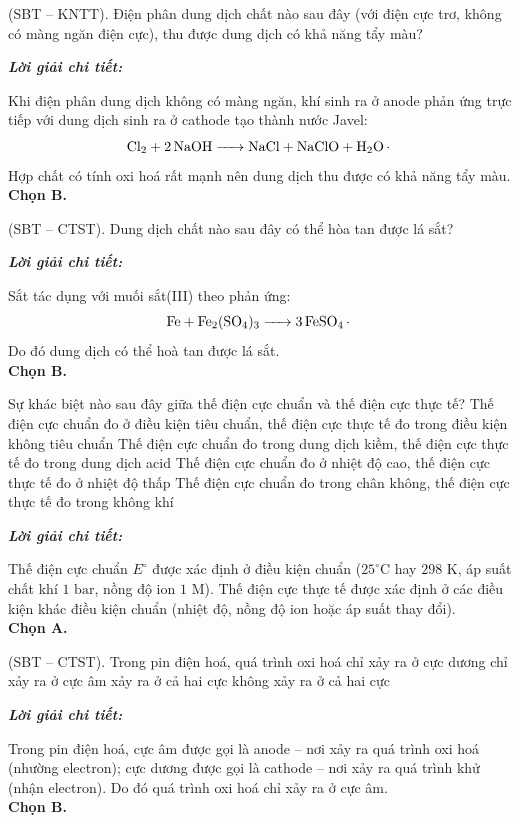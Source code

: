 \documentclass[11pt,a4paper]{article}
\def\loigiai#1{
\par\begingroup\color{blue!80!black}\small
\noindent\textbf{\textit{Lời giải chi tiết:}}\par
#1\par\endgroup}
\begin{document}
\begin{ex}
(SBT – KNTT). Điện phân dung dịch chất nào sau đây (với điện cực trơ, không có màng ngăn điện cực), thu được dung dịch có khả năng tẩy màu?
\choice
{}
{\True {}}
{}
{}
\loigiai{
Khi điện phân dung dịch \ce{NaCl} không có màng ngăn, khí \ce{Cl2} sinh ra ở anode phản ứng trực tiếp với dung dịch \ce{NaOH} sinh ra ở cathode tạo thành nước Javel:
$$\ce{Cl2 + 2NaOH -> NaCl + NaClO + H2O.}$$
Hợp chất \ce{NaClO} có tính oxi hoá rất mạnh nên dung dịch thu được có khả năng tẩy màu.\\
\textbf{Chọn B.}}
\end{ex}

\begin{ex}
(SBT – CTST). Dung dịch chất nào sau đây có thể hòa tan được lá sắt?
\choice
{}
{\True {}}
{}
{}
\loigiai{
Sắt tác dụng với muối sắt(III) theo phản ứng:
$$\ce{Fe + Fe2(SO4)3 -> 3FeSO4.}$$
Do đó dung dịch \ce{Fe2(SO4)3} có thể hoà tan được lá sắt.\\
\textbf{Chọn B.}}
\end{ex}

\begin{ex}
Sự khác biệt nào sau đây giữa thế điện cực chuẩn và thế điện cực thực tế?
\choice
{\True Thế điện cực chuẩn đo ở điều kiện tiêu chuẩn, thế điện cực thực tế đo trong điều kiện không tiêu chuẩn}
{Thế điện cực chuẩn đo trong dung dịch kiềm, thế điện cực thực tế đo trong dung dịch acid}
{Thế điện cực chuẩn đo ở nhiệt độ cao, thế điện cực thực tế đo ở nhiệt độ thấp}
{Thế điện cực chuẩn đo trong chân không, thế điện cực thực tế đo trong không khí}
\loigiai{
Thế điện cực chuẩn $E^\circ$ được xác định ở điều kiện chuẩn ($25^\circ\text{C}$ hay $298\text{ K}$, áp suất chất khí $1\text{ bar}$, nồng độ ion $1\text{ M}$). Thế điện cực thực tế được xác định ở các điều kiện khác điều kiện chuẩn (nhiệt độ, nồng độ ion hoặc áp suất thay đổi).\\
\textbf{Chọn A.}}
\end{ex}

\begin{ex}
(SBT – CTST). Trong pin điện hoá, quá trình oxi hoá
\choice
{chỉ xảy ra ở cực dương}
{\True chỉ xảy ra ở cực âm}
{xảy ra ở cả hai cực}
{không xảy ra ở cả hai cực}
\loigiai{
Trong pin điện hoá, cực âm được gọi là anode -- nơi xảy ra quá trình oxi hoá (nhường electron); cực dương được gọi là cathode -- nơi xảy ra quá trình khử (nhận electron). Do đó quá trình oxi hoá chỉ xảy ra ở cực âm.\\
\textbf{Chọn B.}}
\end{ex}
\end{document}

